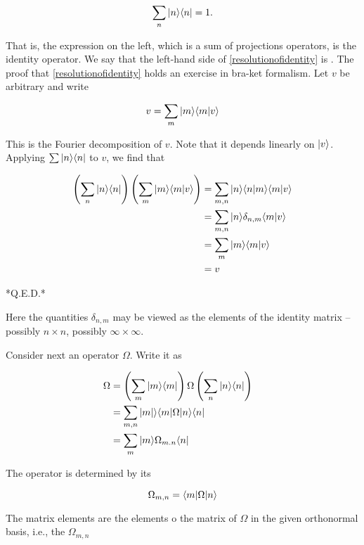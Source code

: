 \begin{equation}
\label{resolutionofidentity}
\sum_n | n \rangle \langle n | = 1.
\end{equation}

That is, the expression on the left, which is a sum of projections operators, is the identity operator.  We say that the left-hand side of \eqref{resolutionofidentity} is  .  The proof that  \eqref{resolutionofidentity} holds an exercise in bra-ket formalism. Let $v$ be arbitrary and write

\begin{equation}
  v = \sum_m | m \rangle\langle m | v \rangle 
\end{equation}

This is the Fourier decomposition of $v$.  Note that it depends linearly on $| v \rangle$. Applying $\sum | n \rangle\langle n|$ to $v$, we find that 

\begin{align}
\left(\sum_n  | n\rangle \langle n |\right) \left(\sum_m | m \rangle\langle m | v \rangle \right) &=
\sum_{m,n}  | n \rangle \langle n |m \rangle\langle m | v \rangle  \\
&= \sum_{m,n}  | n \rangle \delta_{n,m}\langle m | v \rangle \\
& = \sum_{m}  | m \rangle \langle m | v \rangle \\
&= v
\end{align}

*Q.E.D.*

Here the quantities $\delta_{n,m}$ may be viewed as the elements of the identity matrix  -- possibly $n\times n$, possibly $\infty\times\infty$.

Consider next an operator $\Omega$.  Write it as

\begin{align}
\Omega &= \left(\sum_m  | m \rangle \langle m |\right) \Omega \left(\sum_n  | n \rangle \langle n | \right) \\
&= \sum_{m,n}  |m | \rangle \langle m |  \Omega | n \rangle \langle n | & \\
& = \sum_m  | m\rangle   \Omega_{m.n} \langle n |
\end{align}

The operator  is determined by its 

\begin{equation}
\Omega_{m,n} = \langle m |  \Omega | n \rangle
\end{equation}

The matrix elements are the elements o the matrix of  $\Omega$ in the given orthonormal basis, i.e.,  the $\Omega_{m,n}$

